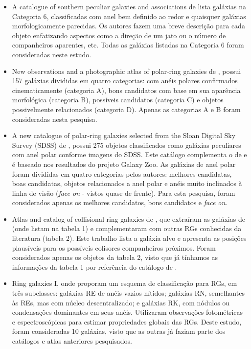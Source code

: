 \begin{itemize}
    \item A catalogue of southern peculiar galaxies and associations de  lista galáxias na Categoria 6, classificadas com anel bem definido ao redor e quaisquer galáxias morfologicamente parecidas. Os autores fazem uma breve descrição para cada objeto enfatizando aspectos como a direção de um jato ou o número de companheiros aparentes, etc. Todas as galáxias listadas na Categoria 6 foram consideradas neste estudo.
    \item New observations and a photographic atlas of polar-ring galaxies de , possui 157 galáxias divididas em quatro categorias: com anéis polares confirmados cinematicamente (categoria A), bons candidatos com base em sua aparência morfológica (categoria B), possíveis candidatos (categoria C) e objetos possivelmente relacionados (categoria D). Apenas as categorias A e B foram consideradas nesta pesquisa.
    \item A new catalogue of polar-ring galaxies selected from the Sloan Digital Sky Survey (SDSS) de , possui 275 objetos classificados como galáxias peculiares com anel polar conforme imagens do SDSS. Este catálogo complementa o de  e é baseado nos resultados do projeto Galaxy Zoo. As galáxias de anel polar foram divididas em quatro categorias pelos autores: melhores candidatas, boas candidatas, objetos relacionados a anel polar e anéis muito inclinados à linha de visão (\emph{face on} - vistos quase de frente). Para esta pesquisa, foram considerados apenas os melhores candidatos, bons candidatos e \emph{face on}.
    \item Atlas and catalog of collisional ring galaxies de , que extraíram  as galáxias de  (onde listam na tabela 1) e complementaram com outras RGs conhecidas da literatura (tabela 2). Este trabalho lista a galáxia alvo e apresenta as posições plausíveis para os possíveis colisores companheiros próximos. Foram considerados apenas os objetos da tabela 2, visto que já tínhamos as informações da tabela 1 por referência do catálogo de . 
    \item Ring galaxies I, onde  proporam um esquema de classificação para RGs, em três subclasses: galáxias RE de anéis vazios nítidos; galáxias RN, semelhantes às REs, mas com núcleo descentralizado; e galáxias RK, com nódulos ou condensações dominantes em seus anéis. Utilizaram observações fotométricas e espectroscópicas para estimar propriedades globais das RGs. Deste estudo, foram consideradas 10 galáxias, visto que as outras já faziam parte dos catálogos e atlas anteriores pesquisados.

\end{itemize}

